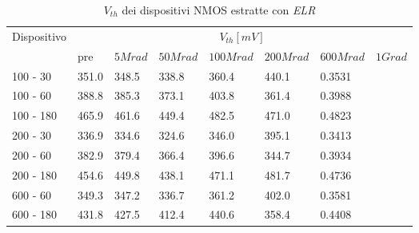 \documentclass[12pt, letterpaper]{book}
\begin{document}
\begin{table}[H]
  \renewcommand{\arraystretch}{1.3}
  \begin{tabular}{m{2cm} m{0.8cm} m{1.1cm} m{1.3cm} m{1.5cm} m{1.5cm} m{1.5cm} m{1cm}}
    \toprule
    \multirow{2}{*}{Dispositivo} & \multicolumn{7}{c}{$V_{th} [mV] $}                                                                    \\
    \cmidrule{2-8}
                                 & pre                                & $5Mrad$ & $50Mrad$ & $100Mrad$ & $200Mrad$ & $600Mrad$ & $1Grad$ \\
    \midrule
    100 - 30                     & 351.0                              & 348.5   & 338.8    & 360.4     & 440.1     & 0.3531    &         \\
    \hline
    100 - 60                     & 388.8                              & 385.3   & 373.1    & 403.8     & 361.4     & 0.3988    &         \\
    \hline
    100 - 180                    & 465.9                              & 461.6   & 449.4    & 482.5     & 471.0     & 0.4823    &         \\
    \hline
    200 - 30                     & 336.9                              & 334.6   & 324.6    & 346.0     & 395.1     & 0.3413    &         \\
    \hline
    200 - 60                     & 382.9                              & 379.4   & 366.4    & 396.6     & 344.7     & 0.3934    &         \\
    \hline
    200 - 180                    & 454.6                              & 449.8   & 438.1    & 471.1     & 481.7     & 0.4736    &         \\
    \hline
    600 - 60                     & 349.3                              & 347.2   & 336.7    & 361.2     & 402.0     & 0.3581    &         \\
    \hline
    600 - 180                    & 431.8                              & 427.5   & 412.4    & 440.6     & 358.4     & 0.4408    &         \\
    \bottomrule
  \end{tabular}
  \caption{$V_{th}$ dei dispositivi NMOS estratte con \emph{ELR}}
  \label{tab:VthELRN}
\end{table}
\end{document}

